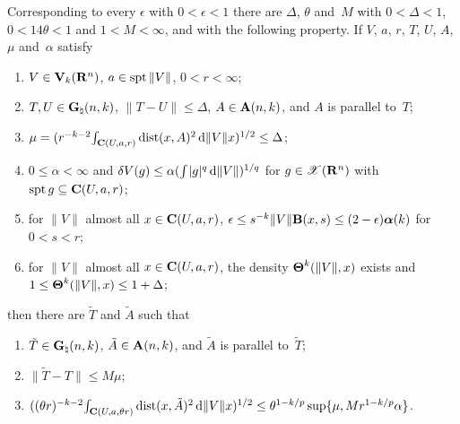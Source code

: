 \begin{theorem}
    \label{al:8.16}
    Corresponding to every $\epsilon$ with $0 < \epsilon < 1$ there are $\Delta$, $\theta$ and~$M$
    with $0 < \Delta < 1$, $0 < 14 \theta < 1$ and $1 < M < \infty$, and with the following
    property. If $V$, $a$, $r$, $T$, $U$, $A$, $\mu$ and~$\alpha$ satisfy
    \begin{enumerate}[label=(\arabic*)]
        \item \label{al:8.16(1)} $V \in \mathbf{V}_{k}(\mathbf{R}^{n})$, $a \in \operatorname{spt} \|V\|$, $0 < r <
            \infty$;
        \item \label{al:8.16(2)} $T, U \in \mathbf{G}_{\natural}(n,k)$, $\|T - U\| \le \Delta$, $A \in
            \mathbf{A}(n,k)$, and $A$ is parallel to~$T$;
        \item \label{al:8.16(3)} $\mu = (r^{-k-2} {\textstyle\int_{\mathbf{C} ( U, a, r )}^{}} \operatorname{dist}(x,A)^2
            \,\mathrm{d} \|V\| x)^{1/2} \le \Delta$;
        \item \label{al:8.16(4)} $0 \le \alpha < \infty$ and $\delta V(g) \le \alpha ({\textstyle\int_{}^{}}
            |g|^q \,\mathrm{d} \|V\|)^{1/q}$ for $g \in \mathscr{X}(\mathbf{R}^{n})$ with $\operatorname{spt} g \subseteq
            \mathbf{C} ( U, a, r )$;
        \item \label{al:8.16(5)} for $\|V\|$ almost all $x \in \mathbf{C} ( U, a, r )$, $\epsilon \le
            s^{-k} \|V\| \mathbf{B}(x,s) \le (2 - \epsilon) \boldsymbol{\alpha}(k)$ for $0 < s <
            r$;
        \item \label{al:8.16(6)} for $\|V\|$ almost all $x \in \mathbf{C} ( U, a, r )$, the density
            $\boldsymbol{\Theta}^{k}(\|V\|,x)$ exists and $1 \le \boldsymbol{\Theta}^{k}(\|V\|,x) \le 1 + \Delta$;
    \end{enumerate}
    then there are $\tilde T$ and $\tilde A$ such that
    \begin{enumerate}[label=(\arabic*),start=7]
        \item \label{al:8.16(7)} $\tilde T \in \mathbf{G}_{\natural}(n,k)$, $\tilde A \in
            \mathbf{A}(n,k)$, and $\tilde A$ is parallel to~$\tilde T$;
        \item \label{al:8.16(8)} $\|\tilde T - T\| \le M \mu$;
        \item \label{al:8.16(9)} $((\theta r)^{-k-2} {\textstyle\int_{\mathbf{C} ( U, a, \theta r )}^{}}
            \operatorname{dist}(x, \tilde A)^2 \,\mathrm{d} \|V\| x)^{1/2} \le \theta^{1 - k/p} \sup \{ \mu, M r^{1 -
            k/p} \alpha \}$.
    \end{enumerate}
\end{theorem}

